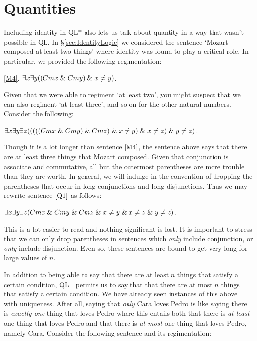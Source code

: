 \section{Quantities}
  \label{sec:Quantities}

Including identity in QL$^=$ also lets us talk about quantity in a way that wasn't possible in QL.
In \S\ref{sec:IdentityLogic} we considered the sentence `Mozart composed at least two things' where identity was found to play a critical role.
In particular, we provided the following regimentation:

\begin{earg}
  \item[\ref{M4}.] $\exists x\exists y((Cmx \mathrel\& Cmy) \mathrel\& x\neq y)$.
\end{earg}

Given that we were able to regiment `at least two', you might suspect that we can also regiment `at least three', and so on for the other natural numbers.
Consider the following:

\begin{earg}
  \item[\ex{Q1}] $\exists x\exists y\exists z(((((Cmx \mathrel\& Cmy) \mathrel\& Cmz) \mathrel\& x\neq y) \mathrel\& x\neq z) \mathrel\& y\neq z)$.
\end{earg}

Though it is a lot longer than sentence $\ref{M4}$, the sentence above says that there are at least three things that Mozart composed.
Given that conjunction is associate and commutative, all but the outermost parentheses are more trouble than they are worth.
In general, we will indulge in the convention of dropping the parentheses that occur in long conjunctions and long disjunctions.
Thus we may rewrite sentence $\ref{Q1}$ as follows:

\begin{earg}
  \item[\ex{Q2}] $\exists x\exists y\exists z(Cmx \mathrel\& Cmy \mathrel\& Cmz \mathrel\& x\neq y \mathrel\& x\neq z \mathrel\& y\neq z)$.
\end{earg}

This is a lot easier to read and nothing significant is lost.
It is important to stress that we can only drop parentheses in sentences which \textit{only} include conjunction, or \textit{only} include disjunction.
Even so, these sentences are bound to get very long for large values of $n$.

In addition to being able to say that there are at least $n$ things that satisfy a certain condition, QL$^=$ permits us to say that that there are at most $n$ things that satisfy a certain condition. 
We have already seen instances of this above with uniqueness.
After all, saying that \textit{only} Cara loves Pedro is like saying there is \textit{exactly one} thing that loves Pedro where this entails both that there is \textit{at least} one thing that loves Pedro and that there is \textit{at most} one thing that loves Pedro, namely Cara.
Consider the following sentence and its regimentation:

